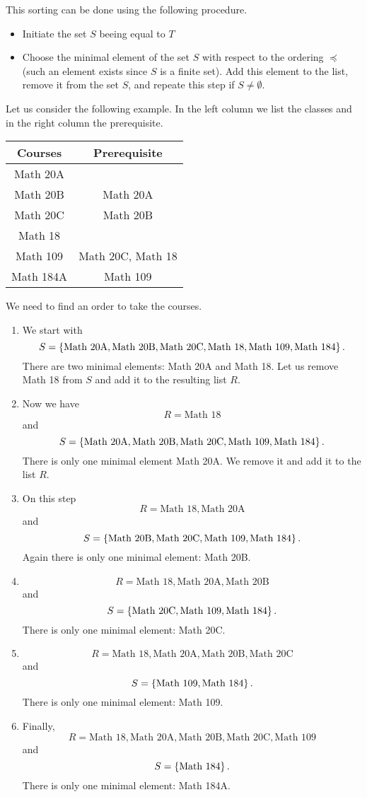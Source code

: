 This sorting can be done using the following procedure.
\begin{itemize}
  \item Initiate the set $S$ beeing equal to $T$
  \item Choose the minimal element of the set $S$ with respect to the ordering
    $\preceq$ (such an element exists since $S$ is a finite set).
    Add this element to the list, remove it from the set $S$, and repeate this
    step if $S \neq \emptyset$.
\end{itemize}

Let us consider the following example. In the left column we list the classes
and in the right column the prerequisite.
\begin{center}
  \begin{tabular}{c | c}
    Courses & Prerequisite \\
    \hline
    Math 20A \\
    Math 20B & Math 20A \\
    Math 20C & Math 20B \\
    Math 18 \\
    Math 109 & Math 20C, Math 18 \\
    Math 184A & Math 109
  \end{tabular}
\end{center}
We need to find an order to take the courses.
\begin{enumerate}
  \item We start with
    \[
      S = \set{\text{Math 20A}, \text{Math 20B},
        \text{Math 20C}, \text{Math 18}, \text{Math 109}, \text{Math 184}}.
    \]
    There are two minimal elements: Math 20A and Math 18. Let us remove Math 18
    from $S$ and add it to the resulting list $R$.
  \item Now we have
    \[
      R = \text{Math 18}
    \]
    and
    \[
      S = \set{\text{Math 20A},
      \text{Math 20B}, \text{Math 20C}, \text{Math 109}, \text{Math 184}}.
    \]
    There is only one minimal element Math 20A. We remove it and add it to the
    list $R$.
  \item On this step
    \[
      R = \text{Math 18}, \text{Math 20A}
    \]
    and
    \[
      S = \set{
        \text{Math 20B}, \text{Math 20C}, \text{Math 109}, \text{Math 184}}.
    \]
    Again there is only one minimal element: Math 20B.
  \item
    \[
      R = \text{Math 18}, \text{Math 20A}, \text{Math 20B}
    \] and
    \[
      S = \set{\text{Math 20C}, \text{Math 109}, \text{Math 184}}.
    \]
    There is only one minimal element: Math 20C.
  \item
    \[
      R = \text{Math 18}, \text{Math 20A}, \text{Math 20B}, \text{Math 20C}
    \]
    and
    \[
      S = \set{\text{Math 109}, \text{Math 184}}.
    \]
    There is only one minimal element: Math 109.
  \item Finally,
    \[
      R = \text{Math 18}, \text{Math 20A}, \text{Math 20B}, \text{Math 20C},
      \text{Math 109}
    \]
    and
    \[
      S = \set{\text{Math 184}}.
    \]
    There is only one minimal element: Math 184A.
\end{enumerate}
